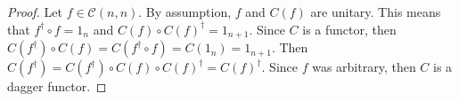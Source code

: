 \begin{proof}
    Let $f \in \mathcal{C}( n, n )$.
    By assumption, $f$ and $C( f )$ are unitary.
    This means that $f^\dagger \circ f = 1_n$ and $C( f ) \circ C( f )^\dagger = 1_{n+1}$.
    Since $C$ is a functor, then $C( f^\dagger ) \circ C( f ) = C( f^\dagger \circ f ) = C( 1_n ) = 1_{n+1}$.
    Then $C( f^\dagger ) = C( f^\dagger) \circ C( f ) \circ C( f )^\dagger = C( f )^\dagger$.
    Since $f$ was arbitrary, then $C$ is a dagger functor.
\end{proof}
